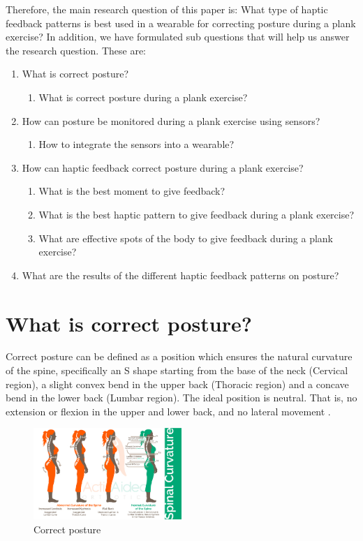 \documentclass[sigconf]{acmart}
\begin{document}
Therefore, the main research question of this paper is: What type of haptic feedback patterns is best used in a wearable for correcting posture during a plank exercise? In addition, we have formulated sub questions that will help us answer the research question. These are:
\begin{enumerate}
\item What is correct posture? 
	\begin{enumerate}
		 \item What is correct posture during a plank exercise?
 	\end{enumerate}
\item How can posture be monitored during a plank exercise using sensors?
	\begin{enumerate}
		\item	How to integrate the sensors into a wearable?
	\end{enumerate}
\item How can haptic feedback correct posture during a plank exercise?
	\begin{enumerate}
		\item What is the best moment to give feedback?
 		\item What is the best haptic pattern to give feedback during a plank exercise?
 		\item What are effective spots of the body to give feedback during a plank exercise?
 	\end{enumerate}
\item What are the results of the different haptic feedback patterns on posture?
\end{enumerate}


\section{What is correct posture? }
Correct posture can be defined as a position which ensures the natural curvature of the spine, specifically an  \textquotesingle S \textquotesingle shape starting from the base of the neck (Cervical region), a slight convex bend in the upper back (Thoracic region) and a concave bend in the lower back (Lumbar region).  The ideal position is neutral. That is, no extension or flexion in the upper and lower back, and no lateral movement \cite{activaided}.
\begin{figure}[h]
\centering
\includegraphics[width=0.5\textwidth, scale=1]{CorrectPosture.png}
\caption{Correct posture }
\end{figure}
\end{document}
